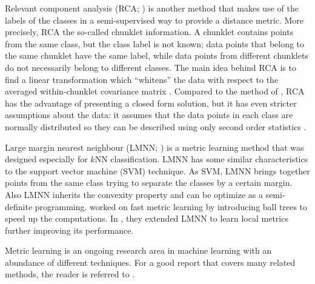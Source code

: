 Relevant component analysis (RCA; \citealp{bar2003, shental2002}) is another method that makes use of the labels of the classes in a semi-supervised way to provide a distance metric. More precisely, RCA the so-called chunklet information. A chunklet contains points from the same class, but the class label is not known; data points that belong to the same chunklet have the same label, while data points from different chunklets do not necessarily belong to different classes. The main idea behind RCA is to find a linear transformation which ``whitens'' the data with respect to the averaged within-chunklet covariance matrix \citep{weinberger2009}. Compared to the method of \citet{xing2003}, RCA has the advantage of presenting a closed form solution, but it has even stricter assumptions about the data: it assumes that the data points in each class are normally distributed so they can be described using only second order statistics \citep{goldberger2004}.

Large margin nearest neighbour (LMNN; \citealp{weinberger2009}) is a metric learning method that was designed especially for $k$NN classification. LMNN has some similar characteristics to the support vector machine (SVM) technique. As SVM, LMNN brings together points from the same class trying to separate the classes by a certain margin. Also LMNN inherits the convexity property and can be optimize as a semi-definite programming. \citet{weinberger2008} worked on fast metric learning by introducing ball trees to speed up the computations. In \citep{weinberger2008}, they extended LMNN to learn local metrics further improving its performance.

Metric learning is an ongoing research area in machine learning with an abundance of different techniques. For a good report that covers many related methods, the reader is referred to \citep{yang2006}.
